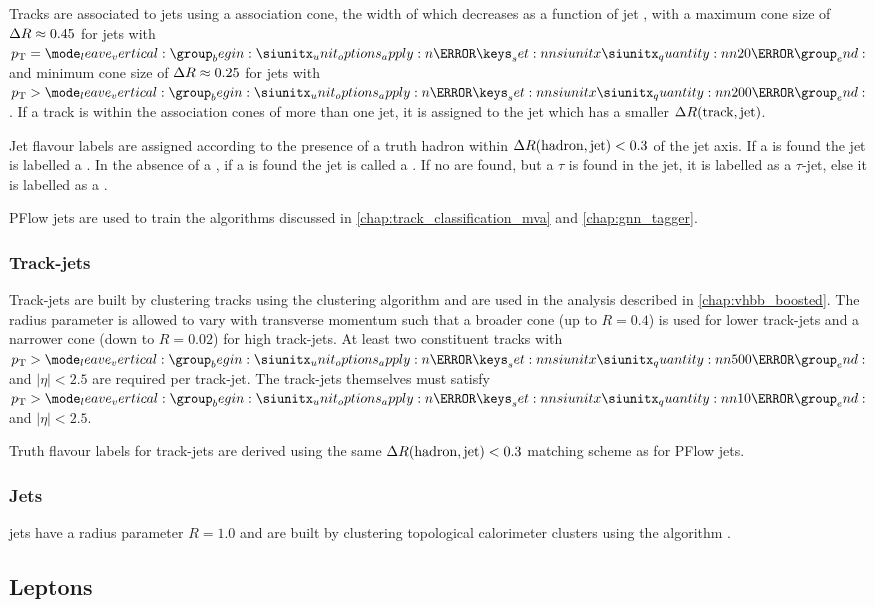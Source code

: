 Tracks are associated to jets using a \DeltaR association cone, the width of which decreases as a function of jet \pt, with a maximum cone size of $\Delta R \approx 0.45$ for jets with $\pt = \SI{20}{\GeV}$ and minimum cone size of $\Delta R \approx 0.25$ for jets with $\pt > \SI{200}{\GeV}$. 
If a track is within the association cones of more than one jet, it is assigned to the jet which has a smaller $\Delta R(\text{track}, \text{jet})$.

Jet flavour labels are assigned according to the presence of a truth hadron within ${\Delta R(\text{hadron},\text{jet})<0.3}$ of the jet axis. If a \bhadron is found the jet is labelled a \bjet. In the absence of a \bhadron, if a \chadron is found the jet is called a \cjet.
If no \borchadrons are found, but a $\tau$ is found in the jet, it is labelled as a $\tau$-jet, else it is labelled as a \ljet.

PFlow jets are used to train the algorithms discussed in \cref{chap:track_classification_mva} and \cref{chap:gnn_tagger}.

\subsubsection{Track-jets}
Track-jets are built by clustering tracks using the \antikt clustering algorithm and are used in the analysis described in \cref{chap:vhbb_boosted}.
The radius parameter is allowed to vary with transverse momentum such that a broader cone (up to $R=0.4$) is used for lower \pt track-jets and a narrower cone (down to $R=0.02$) for high \pt track-jets.
At least two constituent tracks with $\pt > \SI{500}{\MeV}$ and $|\eta| < 2.5$ are required per track-jet.
The track-jets themselves must satisfy $\pt > \SI{10}{\GeV}$ and $|\eta| < 2.5$.

Truth flavour labels for track-jets are derived using the same ${\Delta R(\text{hadron},\text{jet})<0.3}$ matching scheme as for PFlow jets.

\subsubsection{\LargeR Jets}
\LargeR jets have a radius parameter $R=1.0$ and are built by clustering topological calorimeter clusters using the \antikt algorithm \cite{Butterworth:2008iy}.



\subsection{Leptons}\label{sec:lepton_reco}

